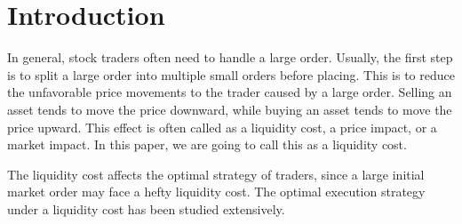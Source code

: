 \documentclass[11pt]{article}
\theoremstyle{plain}
\numberwithin{equation}{section}
\begin{document}
\section{Introduction}
%

\par In general, stock traders often need to handle a large order. Usually, the first step is to split a large order into multiple small orders before placing. This is to reduce the unfavorable price movements to the trader caused by a large order. Selling an asset tends to move the price downward, while buying an asset tends to move the price upward. This effect is often called as a liquidity cost, a price impact, or a market impact. In this paper, we are going to call this as a liquidity cost. 

\medskip
\par The liquidity cost affects the optimal strategy of traders, since a large initial market order may face a hefty liquidity cost. The optimal execution strategy under a liquidity cost has been studied extensively. 
\end{document}

